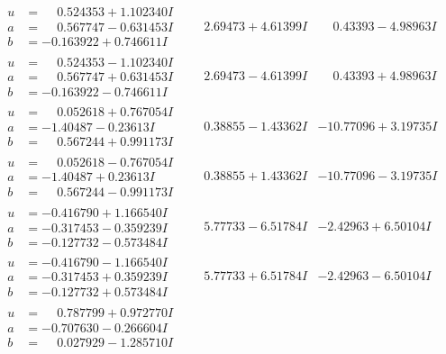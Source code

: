 \documentclass[1p]{elsarticle_modified}
\theoremstyle{definition}
\begin{document}
$$\begin{array}{c|c|c}
\begin{aligned}
u &= \phantom{-}0.524353 + 1.102340 I \\
a &= \phantom{-}0.567747 - 0.631453 I \\
b &= -0.163922 + 0.746611 I\end{aligned}
 & \phantom{-}2.69473 + 4.61399 I & \phantom{-}0.43393 - 4.98963 I \\ \hline\begin{aligned}
u &= \phantom{-}0.524353 - 1.102340 I \\
a &= \phantom{-}0.567747 + 0.631453 I \\
b &= -0.163922 - 0.746611 I\end{aligned}
 & \phantom{-}2.69473 - 4.61399 I & \phantom{-}0.43393 + 4.98963 I \\ \hline\begin{aligned}
u &= \phantom{-}0.052618 + 0.767054 I \\
a &= -1.40487 - 0.23613 I \\
b &= \phantom{-}0.567244 + 0.991173 I\end{aligned}
 & \phantom{-}0.38855 - 1.43362 I & -10.77096 + 3.19735 I \\ \hline\begin{aligned}
u &= \phantom{-}0.052618 - 0.767054 I \\
a &= -1.40487 + 0.23613 I \\
b &= \phantom{-}0.567244 - 0.991173 I\end{aligned}
 & \phantom{-}0.38855 + 1.43362 I & -10.77096 - 3.19735 I \\ \hline\begin{aligned}
u &= -0.416790 + 1.166540 I \\
a &= -0.317453 - 0.359239 I \\
b &= -0.127732 - 0.573484 I\end{aligned}
 & \phantom{-}5.77733 - 6.51784 I & -2.42963 + 6.50104 I \\ \hline\begin{aligned}
u &= -0.416790 - 1.166540 I \\
a &= -0.317453 + 0.359239 I \\
b &= -0.127732 + 0.573484 I\end{aligned}
 & \phantom{-}5.77733 + 6.51784 I & -2.42963 - 6.50104 I \\ \hline\begin{aligned}
u &= \phantom{-}0.787799 + 0.972770 I \\
a &= -0.707630 - 0.266604 I \\
b &= \phantom{-}0.027929 - 1.285710 I\end{aligned}

\end{array}$$
\end{document}
